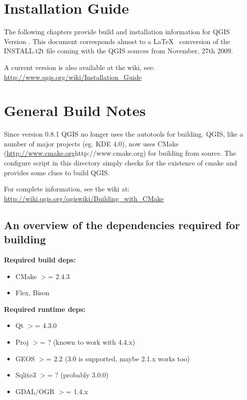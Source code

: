 
\section{Installation Guide}\label{label_install}


The following chapters provide build and installation information for QGIS
Version \CURRENT. This document corresponds almost to a \LaTeX~ conversion of
the INSTALL.t2t file coming with the QGIS sources from November, 27th 2009.

A current version is also available at the wiki, see:
\url{http://www.qgis.org/wiki/Installation_Guide}

\section{General Build Notes}
Since version 0.8.1 QGIS no longer uses the autotools for building. QGIS, like a
number of major projects (eg. KDE 4.0), now uses CMake (\url {http://www.cmake.org}{http://www.cmake.org})
for building from source. The configure script in this directory simply checks
for the existence of cmake and provides some clues to build QGIS.

For complete information, see the wiki at:
\url{http://wiki.qgis.org/qgiswiki/Building\_with\_CMake}

\subsection{An overview of the dependencies required for building}
\textbf{Required build deps:}
\begin{itemize}
\item CMake $>$= 2.4.3
\item Flex, Bison
\end{itemize}

\textbf{Required runtime deps:}
\begin{itemize}
\item Qt $>$= 4.3.0
\item Proj $>$= ? (known to work with 4.4.x)
\item GEOS $>$= 2.2 (3.0 is supported, maybe 2.1.x works too)
\item Sqlite3 $>$= ? (probably 3.0.0)
\item GDAL/OGR $>$= 1.4.x
\end{itemize}

